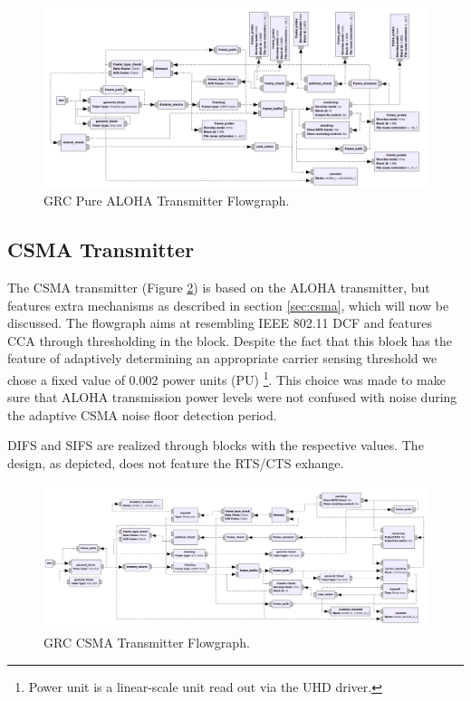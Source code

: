\begin{figure}
	\label{fig:grc-aloha-transmitter}
	\begin{center}
		\includegraphics[width=\textwidth]{pictures/grc_aloha_transmitter_flowgraph}
\end{center}
\caption{GRC Pure ALOHA Transmitter Flowgraph.}
\end{figure}

\subsection{CSMA Transmitter}
\label{sec:csma-transmiter}

The CSMA transmitter (Figure \ref{fig:grc-csma-transmitter}) is based on the ALOHA transmitter, but features extra mechanisms as described in section \ref{sec:csma}, which will now be discussed. The flowgraph aims at resembling IEEE 802.11 DCF and features CCA through thresholding in the  block. Despite the fact that this block has the feature of adaptively determining an appropriate carrier sensing threshold we chose a fixed value of 0.002 power units (PU) \footnote{Power unit is a linear-scale unit read out via the UHD driver.}. This choice was made to make sure that ALOHA transmission power levels were not confused with noise during the adaptive CSMA noise floor detection period. 

DIFS and SIFS are realized through  blocks with the respective values. The design, as depicted, does not feature the RTS/CTS exhange.

\begin{figure}
	\label{fig:grc-csma-transmitter}
	\begin{center}
		\includegraphics[width=\textwidth]{pictures/grc_csma_transmitter_flowgraph}
\end{center}
\caption{GRC CSMA Transmitter Flowgraph.}
\end{figure}

